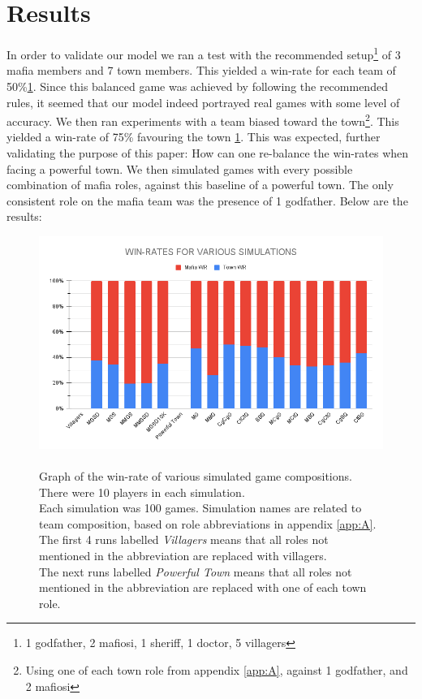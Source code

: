 \section{Results}\label{sec:results}
In order to validate our model we ran a test with the recommended
setup\footnote[1]{1 godfather, 2 mafiosi, 1 sheriff, 1 doctor, 5 villagers} of
3 mafia members and 7 town members\cite{MafiaRules}. This yielded a win-rate
for each team of 50\%\ref*{fig:VariousSimulations}. Since this balanced game
was achieved by following the recommended rules, it seemed that our model
indeed portrayed real games with some level of accuracy. We then ran
experiments with a team biased toward the town\footnote{Using one of each town
    role from appendix \ref{app:A}, against 1 godfather, and 2 mafiosi}. This
yielded a win-rate of 75\% favouring the town \ref{fig:VariousSimulations}.
This was expected, further validating the purpose of this paper: How can one
re-balance the win-rates when facing a powerful town. We then simulated games
with every possible combination of mafia roles, against this baseline of a
powerful town. The only consistent role on the mafia team was the presence of 1
godfather. Below are the results:
\begin{figure}[H]
    \includegraphics[width=1\linewidth]{figures/Winrates}
    \caption{\\Graph of the win-rate of various simulated game compositions.\\
        There were 10 players in each simulation.\\
        Each simulation was 100 games.
        Simulation names are related to team composition, based on role
        abbreviations in appendix \ref{app:A}.\\
        The first 4 runs labelled \textit{Villagers} means that all roles not
        mentioned in the abbreviation are replaced with villagers.\\
        The next runs labelled \textit{Powerful Town} means that all roles not
        mentioned in the abbreviation are replaced with	one of each town role.}
    \label{fig:VariousSimulations}
\end{figure}
